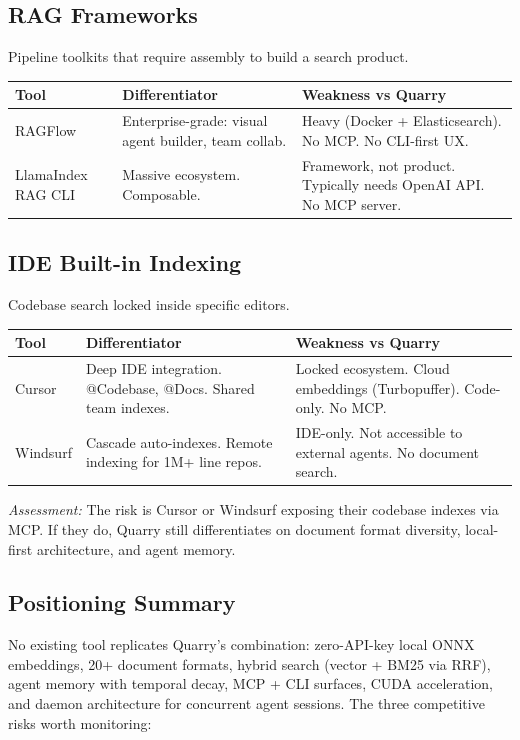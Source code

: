 \documentclass[11pt,letterpaper]{article}
\begin{document}
\subsection*{RAG Frameworks}

Pipeline toolkits that require assembly to build a search product.

\begin{tabularx}{\textwidth}{@{} l X X @{}}
\toprule
\textbf{Tool} & \textbf{Differentiator} & \textbf{Weakness vs Quarry} \\
\midrule
RAGFlow & Enterprise-grade: visual agent builder, team collab. & Heavy (Docker + Elasticsearch). No MCP. No CLI-first UX. \\
LlamaIndex RAG CLI & Massive ecosystem. Composable. & Framework, not product. Typically needs OpenAI API. No MCP server. \\
\bottomrule
\end{tabularx}

\subsection*{IDE Built-in Indexing}

Codebase search locked inside specific editors.

\begin{tabularx}{\textwidth}{@{} l X X @{}}
\toprule
\textbf{Tool} & \textbf{Differentiator} & \textbf{Weakness vs Quarry} \\
\midrule
Cursor & Deep IDE integration. @Codebase, @Docs. Shared team indexes. & Locked ecosystem. Cloud embeddings (Turbopuffer). Code-only. No MCP. \\
Windsurf & Cascade auto-indexes. Remote indexing for 1M+ line repos. & IDE-only. Not accessible to external agents. No document search. \\
\bottomrule
\end{tabularx}

\vspace{0.5em}
\textit{Assessment:} The risk is Cursor or Windsurf exposing their codebase
indexes via MCP. If they do, Quarry still differentiates on document format
diversity, local-first architecture, and agent memory.

\subsection*{Positioning Summary}

No existing tool replicates Quarry's combination: zero-API-key local ONNX
embeddings, 20+ document formats, hybrid search (vector + BM25 via RRF),
agent memory with temporal decay, MCP + CLI surfaces, CUDA acceleration, and
daemon architecture for concurrent agent sessions. The three competitive risks
worth monitoring:
\end{document}
